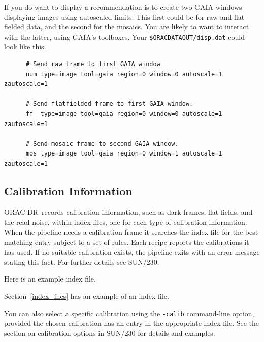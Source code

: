 \documentclass[twoside,11pt]{article}
\newcommand{\htmlref}[2]{#1}
\newenvironment{latexonly}{}{}
\newcommand{\xref}[3]{#1}
\newcommand{\xlabel}[1]{}
\renewcommand{\_}{\texttt{\symbol{95}}}
\newcommand{\GAIA}{{\footnotesize GAIA}}
\newcommand{\ORACDR}{{\footnotesize ORAC-DR}}
\begin{document}
If you do want to display a recommendation is to create two GAIA windows
displaying images using autoscaled limits.  This first could be for
raw and flat-fielded data, and the second for the mosaics.  You are
likely to want to interact with the latter, using \GAIA's toolboxes.
Your {\tt \$ORAC\_DATA\_OUT/disp.dat} could look like this.

\begin{verbatim}
      # Send raw frame to first GAIA window 
      num type=image tool=gaia region=0 window=0 autoscale=1 zautoscale=1

      # Send flatfielded frame to first GAIA window.
      ff  type=image tool=gaia region=0 window=0 autoscale=1 zautoscale=1

      # Send mosaic frame to second GAIA window.
      mos type=image tool=gaia region=0 window=1 autoscale=1 zautoscale=1
\end{verbatim}

\subsection{\xlabel{calibration_information}Calibration Information\label{calibration_information}}

\ORACDR\ records calibration information, such as dark frames, flat
fields, and the read noise, within index files, one for each type of
calibration information.  When the pipeline needs a calibration frame
it searches the index file for the best matching entry subject to a
set of rules. Each recipe reports the calibrations it has used.  If no
suitable calibration exists, the pipeline exits with an error message
stating this fact.  For further details see
\xref{SUN/230}{sun230}{calibration_selection}.
\begin{htmlonly}
Here is an 
\htmlref{example index file.}{index_files}
\end{htmlonly}
\begin{latexonly}
Section~\ref{index_files} has an example of an index file.
\end{latexonly}

You can also select a specific calibration using the {\tt -calib}
command-line option, provided the chosen calibration has an entry
in the appropriate index file.  See
\begin{latexonly}
the section on
\end{latexonly}
\xref{calibration options}{sun230}{calibration_options}
\begin{latexonly}
in SUN/230
\end{latexonly}
for details and examples.
\end{document}
